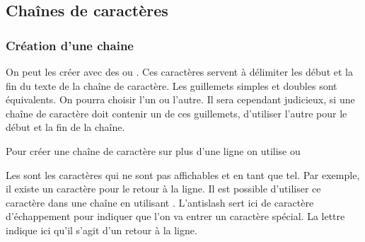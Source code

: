 \documentclass[letterpaper,10pt,english]{sphinxhowto}
\begin{document}
\subsection{Chaînes de caractères}
\label{\detokenize{cours4_chaine_caractere_cours:chaines-de-caracteres}}\label{\detokenize{cours4_chaine_caractere_cours::doc}}

\subsubsection{Création d’une chaine}
\label{\detokenize{cours4_chaine_caractere_cours:creation-d-une-chaine}}
\sphinxAtStartPar
On peut les créer avec des  ou .  Ces caractères servent à délimiter les
début et la fin du texte de la chaîne de caractère. Les guillemets
simples  et doubles  sont équivalents. On pourra choisir l’un ou
l’autre. Il sera cependant judicieux, si une chaîne de caractère doit contenir
un de ces guillemets, d’utiliser l’autre pour le début et la fin de la chaîne.

\begin{sphinxVerbatim}[commandchars=\\\{\}]
  
  
  
\end{sphinxVerbatim}

\sphinxAtStartPar
Pour créer une chaîne de caractère sur plus d’une ligne on utilise  ou 

\begin{sphinxVerbatim}[commandchars=\\\{\}]
  
\end{sphinxVerbatim}

\sphinxAtStartPar
Les  sont les caractères qui ne sont pas affichables et en tant que tel.
Par exemple, il existe un caractère pour le retour à la ligne. Il est possible
d’utiliser ce caractère dans une chaîne en utilisant . L’antislash sert
ici de caractère d’échappement pour indiquer que l’on va entrer un caractère
spécial. La lettre  indique ici qu’il s’agit d’un retour à la ligne.
\end{document}
